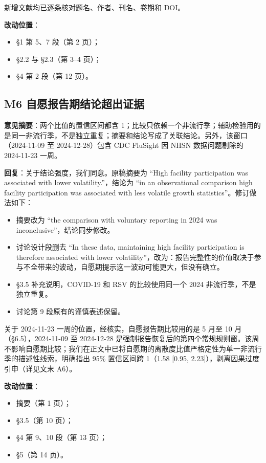 \documentclass[UTF8,a4paper,11pt,fontset=none]{ctexart}
\providecommand{\tightlist}{\setlength{\itemsep}{1pt}\setlength{\parskip}{0pt}}
\begin{document}
新增文献均已逐条核对题名、作者、刊名、卷期和 DOI。

\textbf{改动位置}：

\begin{itemize}
\tightlist
\item
  §1 第 5、7 段（第 2 页）；
\item
  §2.2 与 §2.3（第 3--4 页）；
\item
  §4 第 2 段（第 12 页）。
\end{itemize}

\subsection*{M6 自愿报告期结论超出证据}

\textbf{意见摘要}：两个比值的置信区间都含 1；比较只依赖一个非流行季；辅助检验用的是同一非流行季，不是独立重复；摘要和结论写成了关联结论。另外，该窗口（2024-11-09 至 2024-12-28）包含 CDC FluSight 因 NHSN 数据问题剔除的 2024-11-23 一周。

\textbf{回复}：关于结论强度，我们同意。原稿摘要为 ``High facility participation was associated with lower volatility.''，结论为 ``in an observational comparison high facility participation was associated with less volatile growth statistics''。修订做法如下：

\begin{itemize}
\tightlist
\item
  摘要改为 ``the comparison with voluntary reporting in 2024 was inconclusive''，结论同步修改。
\item
  讨论设计段删去 ``In these data, maintaining high facility participation is therefore associated with lower volatility''，改为：报告完整性的价值取决于参与不全带来的波动，自愿期提示这一波动可能更大，但没有确立。
\item
  §3.5 补充说明，COVID-19 和 RSV 的比较使用同一个 2024 非流行季，不是独立重复。
\item
  讨论第 9 段原有的谨慎表述保留。
\end{itemize}

关于 2024-11-23 一周的位置，经核实，自愿报告期比较用的是 5 月至 10 月（§6.5），2024-11-09 至 2024-12-28 是强制报告恢复后的第四个常规规则窗。该周不影响自愿期比较；我们在正文中已将自愿期的离散度比值严格定性为单一非流行季的描述性线索，明确指出 95\% 置信区间跨 1（1.58 [0.95, 2.23]），剥离因果过度引申（详见文末 A6）。

\textbf{改动位置}：

\begin{itemize}
\tightlist
\item
  摘要（第 1 页）；
\item
  §3.5（第 10 页）；
\item
  §4 第 9、10 段（第 13 页）；
\item
  §5（第 14 页）。
\end{itemize}
\end{document}
